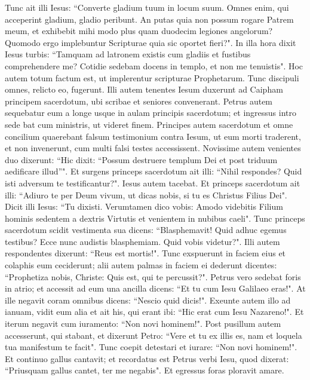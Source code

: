 \begin{biblechapter}
\verse Tunc ait illi Iesus: “Converte gladium tuum in locum suum. Omnes enim, qui acceperint gladium, gladio peribunt. 
\verse An putas quia non possum rogare Patrem meum, et exhibebit mihi modo plus quam duodecim legiones angelorum?  
\verse Quomodo ergo implebuntur Scripturae quia sic oportet fieri?". 
\verse In illa hora dixit Iesus turbis: “Tamquam ad latronem existis cum gladiis et fustibus comprehendere me? Cotidie sedebam docens in templo, et non me tenuistis".  
\verse Hoc autem totum factum est, ut implerentur scripturae Prophetarum. Tunc discipuli omnes, relicto eo, fugerunt. 
\verse Illi autem tenentes Iesum duxerunt ad Caipham principem sacerdotum, ubi scribae et seniores convenerant. 
\verse Petrus autem sequebatur eum a longe usque in aulam principis sacerdotum; et ingressus intro sede bat cum ministris, ut videret finem. 
\verse Principes autem sacerdotum et omne concilium quaerebant falsum testimonium contra Iesum, ut eum morti traderent, 
\verse et non invenerunt, cum multi falsi testes accessissent. Novissime autem venientes duo  
\verse dixerunt: “Hic dixit: “Possum destruere templum Dei et post triduum aedificare illud”". 
\verse Et surgens princeps sacerdotum ait illi: “Nihil respondes? Quid isti adversum te testificantur?". 
\verse Iesus autem tacebat. Et princeps sacerdotum ait illi: “Adiuro te per Deum vivum, ut dicas nobis, si tu es Christus Filius Dei". 
\verse Dicit illi Iesus: “Tu dixisti. Verumtamen dico vobis: Amodo videbitis Filium hominis sedentem a dextris Virtutis et venientem in nubibus caeli". 
\verse Tunc princeps sacerdotum scidit vestimenta sua dicens: “Blasphemavit! Quid adhuc egemus testibus? Ecce nunc audistis blasphemiam. 
\verse Quid vobis videtur?". Illi autem respondentes dixerunt: “Reus est mortis!". 
\verse Tunc exspuerunt in faciem eius et colaphis eum ceciderunt; alii autem palmas in faciem ei dederunt 
\verse dicentes: “Prophetiza nobis, Christe: Quis est, qui te percussit?". 
\verse Petrus vero sedebat foris in atrio; et accessit ad eum una ancilla dicens: “Et tu cum Iesu Galilaeo eras!". 
\verse At ille negavit coram omnibus dicens: “Nescio quid dicis!". 
\verse Exeunte autem illo ad ianuam, vidit eum alia et ait his, qui erant ibi: “Hic erat cum Iesu Nazareno!". 
\verse Et iterum negavit cum iuramento: “Non novi hominem!". 
\verse Post pusillum autem accesserunt, qui stabant, et dixerunt Petro: “Vere et tu ex illis es, nam et loquela tua manifestum te facit". 
\verse Tunc coepit detestari et iurare: “Non novi hominem!". Et continuo gallus cantavit; 
\verse et recordatus est Petrus verbi Iesu, quod dixerat: “Priusquam gallus cantet, ter me negabis". Et egressus foras ploravit amare. 
\end{biblechapter}

